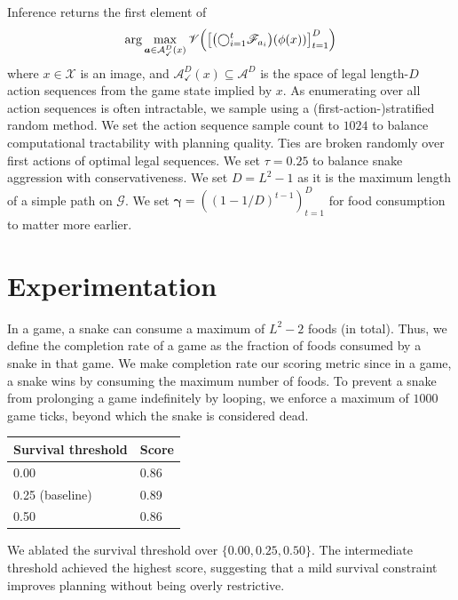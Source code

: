 \documentclass[10pt, twocolumn]{article}
\theoremstyle{definition}
\theoremstyle{remark}
\begin{document}
Inference returns the first element of
$$
	\arg\max_{\bm{a}\in\mathcal{A}_{\checkmark}^{D}(x)}
	\mathscr{V}\mleft(
		\mleft[
			\mleft(
				\bigcirc_{i=1}^{t}
				\mathscr{F}_{a_{i}}
			\mright)
			\mleft(
				\phi(x)
			\mright)
		\mright]_{t=1}^{D}
	\mright)
$$
where $x\in\mathcal{X}$ is an image,
and $\mathcal{A}_{\checkmark}^{D}(x)\subseteq\mathcal{A}^{D}$ is the space of legal length-$D$ action sequences from the game state implied by $x$.
As enumerating over all action sequences is often intractable,
we sample using a (first-action-)stratified random method.
We set the action sequence sample count to $1024$ to balance
computational tractability with planning quality.
Ties are broken randomly over first actions of optimal legal sequences.
We set $\tau=0.25$ to balance snake aggression with conservativeness.
We set $D=L^{2}-1$ as it is the maximum length of a simple path on $\mathcal{G}$.
We set $\bm{\gamma}=((1-1/D)^{t-1})_{t=1}^{D}$ for food consumption to matter more earlier.

\section{Experimentation}

In a game, a snake can consume a maximum of $L^{2}-2$ foods (in total).
Thus, we define the completion rate of a game as the fraction of foods consumed by a snake in that game.
We make completion rate our scoring metric
since in a game, a snake wins by consuming the maximum number of foods.
To prevent a snake from prolonging a game indefinitely by looping, we enforce a maximum of $1000$ game ticks, beyond which the snake is considered dead.


\begin{center}
\begin{tabular}{ll}
\toprule
\textbf{Survival threshold} & \textbf{Score} \\
\midrule
0.00 & 0.86 \\
0.25 (baseline) & 0.89 \\
0.50 & 0.86 \\
\bottomrule
\end{tabular}
\end{center}

We ablated the survival threshold
over $\{0.00, 0.25, 0.50\}$.
The intermediate threshold achieved the highest score, suggesting that a mild survival constraint improves planning without being overly restrictive.
\end{document}
